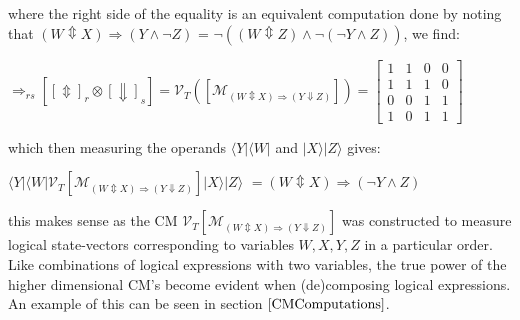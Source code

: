 \documentclass[10pt]{article}
\newcommand{\ket}[1]{$|{#1}\rangle$}
\newcommand{\bra}[1]{$\langle{#1}|$}
\begin{document}
where the right side of the equality is an equivalent computation done by noting that $(W \Updownarrow X) \Rightarrow (Y \wedge \neg Z)$ = $\neg ((W \Updownarrow Z) \wedge \neg (\neg Y \wedge Z))$, we find: \label{ExEqSix}
\begin{center}
$\Rightarrow_{rs}[[\Updownarrow]_r \otimes [\Downarrow]_s] = \mathcal{V}_T([\mathcal{M}_{(W \Updownarrow X) \Rightarrow (Y \Downarrow Z)}]) = \begin{bmatrix} 1 & 1 & 0 & 0 \\ 1 & 1 & 1 & 0 \\ 0 & 0 & 1 & 1 \\ 1 & 0 & 1 & 1 \end{bmatrix}$
\end{center}
which then measuring the operands \bra{Y}\bra{W} and \ket{X}\ket{Z} gives:
\begin{center}
\bra{Y}\bra{W}$\mathcal{V}_T[\mathcal{M}_{(W \Updownarrow X) \Rightarrow (Y \Downarrow Z)}]$\ket{X}\ket{Z} $= (W \Updownarrow X) \Rightarrow (\neg Y \wedge Z)$
\end{center}
this makes sense as the CM $\mathcal{V}_T[\mathcal{M}_{(W \Updownarrow X) \Rightarrow (Y \Downarrow Z)}]$ was constructed to measure logical state-vectors corresponding to variables $W,X,Y,Z$ in a particular order. Like combinations of logical expressions with two variables, the true power of the higher dimensional CM's become evident when (de)composing logical expressions. An example of this can be seen in section $\ref{CMComputations}$.
\end{document}

